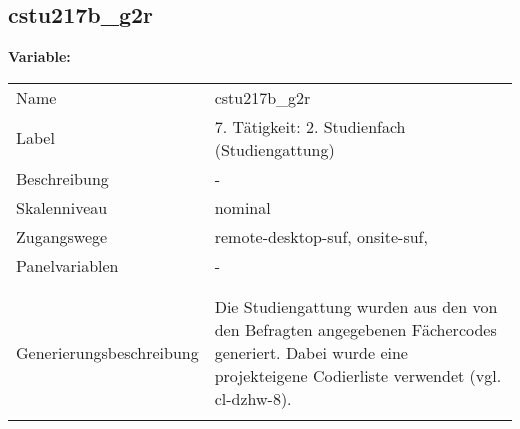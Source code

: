	
	
	\subsection{cstu217b\_g2r}
	\label{subSection:cstu217b_g2r}

	\noindent\textbf{Variable:}\\
		\begin{tabular}{lL{11.3cm}}
			\label{tableVariable:cstu217b_g2r}
			Name & cstu217b\_g2r \\
			Label & 7. Tätigkeit: 2. Studienfach (Studiengattung) \\
			Beschreibung & - \\
			Skalenniveau & nominal \\
			Zugangswege &
				remote-desktop-suf,
				onsite-suf,
 \\
			Panelvariablen & -
			 \\
			 \\
 \\
					Generierungsbeschreibung & Die Studiengattung wurden aus den von den Befragten angegebenen Fächercodes generiert.  Dabei wurde eine projekteigene Codierliste verwendet (vgl. cl-dzhw-8).
				 \\	
			 \\
		\end{tabular}






